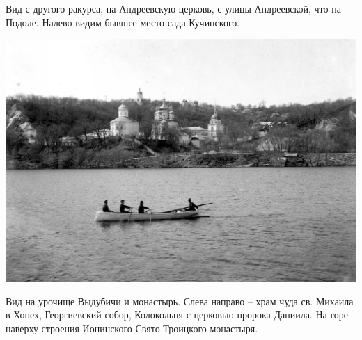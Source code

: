 \documentclass[a5paper,11pt,openany]{article}
\begin{document}
Вид с другого ракурса, на Андреевскую церковь, с улицы Андреевской, что на Подоле. Налево видим бывшее место сада Кучинского.

\vspace*{\fill}

\newpage

\vspace*{\fill}


\begin{center}
\includegraphics[width=\linewidth]{vyd01.jpg}
\end{center}

Вид на урочище Выдубичи и монастырь. Слева направо – храм чуда св. Михаила в Хонех, Георгиевский собор, Колокольня с церковью пророка Даниила. На горе наверху строения Ионинского Свято-Троицкого монастыря.

\vspace*{\fill}


\newpage




%

\begin{thebibliography}{999}

\end{thebibliography}
\end{document}
